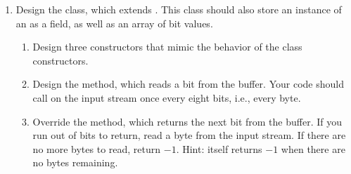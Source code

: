 \begin{enumerate}[label=(\alph*)]
    \item Design the  class, which extends . This class should also store an instance of an  as a field, as well as an array of bit values.
    \begin{enumerate}[label=(\roman*)]
        \item Design three  constructors that mimic the behavior of the  class constructors.
        \item Design the  method, which reads a bit from the buffer. Your code should call  on the input stream once every eight bits, i.e., every byte. 
        \item Override the  method, which returns the next bit from the buffer. If you run out of bits to return, read a byte from the input stream. If there are no more bytes to read, return $-1$. Hint:  itself returns $-1$ when there are no bytes remaining.
    \end{enumerate}
\end{enumerate}


